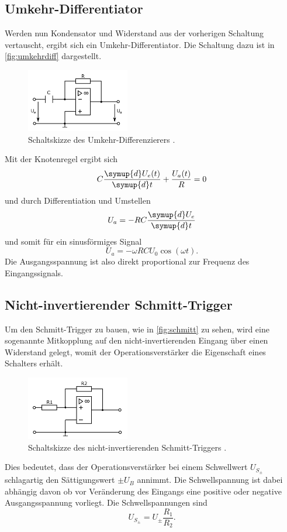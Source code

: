 \subsection{Umkehr-Differentiator}
Werden nun Kondensator und Widerstand aus der vorherigen Schaltung vertauscht, ergibt sich 
ein Umkehr-Differentiator. Die Schaltung dazu ist in \autoref{fig:umkehrdiff}
dargestellt.
\begin{figure}[H]
    \centering
    \includegraphics[width=0.4\textwidth]{diff.png}
    \caption{Schaltskizze des Umkehr-Differenzierers \cite{anleitung}.}
    \label{fig:umkehrdiff}
\end{figure}
Mit der Knotenregel ergibt sich
\begin{equation*}
    C \frac{\symup{d} U_e(t)}{\symup{d} t} + \frac{U_a(t)}{R} = 0
\end{equation*}
und durch Differentiation und Umstellen
\begin{equation*}
    U_a = - R C \frac{\symup{d}U_e}{\symup{d} t}
\end{equation*}
und somit für ein sinusförmiges Signal 
\begin{equation*}
    U_a = - \omega R C U_0 \cos(\omega t).
\end{equation*}
Die Ausgangsspannung ist also direkt proportional zur Frequenz des Eingangssignals.

\subsection{Nicht-invertierender Schmitt-Trigger}
Um den Schmitt-Trigger zu bauen, wie in \autoref{fig:schmitt} zu sehen, wird eine sogenannte
Mitkopplung auf den nicht-invertierenden Eingang über einen Widerstand gelegt, womit der
Operationsverstärker die Eigenschaft eines Schalters erhält.
\begin{figure}[H]
    \centering
    \includegraphics[width=0.4\textwidth]{schmitt.png}
    \caption{Schaltskizze des nicht-invertierenden Schmitt-Triggers \cite{anleitung}.}
    \label{fig:schmitt}
\end{figure}
Dies bedeutet, dass der Operationsverstärker
bei einem Schwellwert $U_{S_{\pm}}$ schlagartig den Sättigungswert $\pm U_B$ annimmt.
Die Schwellspannung ist dabei abhängig davon ob vor Veränderung des Eingangs eine 
positive oder negative Ausgangsspannung vorliegt. 
Die Schwellspannungen sind 
\begin{equation*}
    U_{S_{\pm}} = U_{\pm} \frac{R_1}{R_2}.
\end{equation*}

